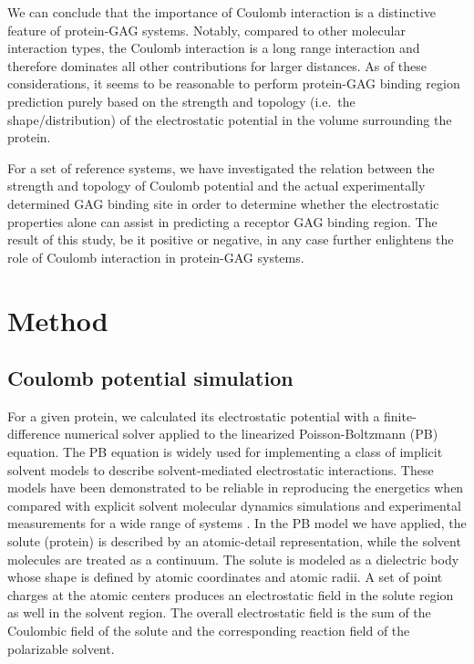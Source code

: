 We can conclude that the importance of Coulomb interaction is a distinctive
feature of protein-GAG systems. Notably, compared to other molecular interaction
types, the Coulomb interaction is a long range interaction and therefore
dominates all other contributions for larger distances. As of these
considerations, it seems to be reasonable to perform protein-GAG binding region
prediction purely based on the strength and topology (i.e.\ the
shape/distribution) of the electrostatic potential in the volume surrounding the
protein.

For a set of reference systems, we have investigated the relation between the
strength and topology of Coulomb potential and the actual experimentally
determined GAG binding site in order to determine whether the electrostatic
properties alone can assist in predicting a receptor GAG binding region. The
result of this study, be it positive or negative, in any case further enlightens
the role of Coulomb interaction in protein-GAG systems.


\section{Method}

\subsection{Coulomb potential simulation}

For a given protein, we calculated its electrostatic potential with a
finite-difference numerical solver applied to the linearized Poisson-Boltzmann
(PB) equation. The PB equation is widely used for implementing a class of
implicit solvent models to describe solvent-mediated electrostatic interactions.
These models have been demonstrated to be reliable in reproducing the energetics
when compared with explicit solvent molecular dynamics simulations and
experimental measurements for a wide range of systems \cite{honig_estatic_1995}.
In the PB model we have applied, the solute (protein) is described by an
atomic-detail representation, while the solvent molecules are treated as a
continuum. The solute is modeled as a dielectric body whose shape is defined by
atomic coordinates and atomic radii. A set of point charges at the atomic
centers produces an electrostatic field in the solute region as well in the
solvent region. The overall electrostatic field is the sum of the Coulombic
field of the solute and the corresponding reaction field of the polarizable
solvent.

